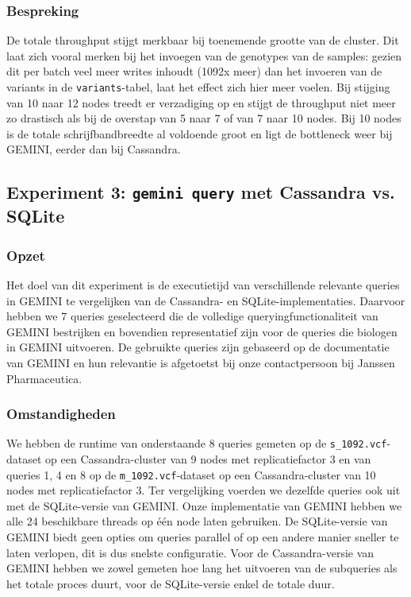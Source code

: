 \subsubsection{Bespreking}

De totale throughput stijgt merkbaar bij toenemende grootte van de cluster. Dit laat zich vooral merken bij het invoegen van de genotypes van de samples: gezien dit per batch veel meer writes inhoudt  (1092x meer) dan het invoeren van de variants in de  \texttt{variants}-tabel, laat het effect zich hier meer voelen. Bij stijging van 10 naar 12 nodes treedt er verzadiging op en stijgt de throughput niet meer zo drastisch als bij de overstap van 5 naar 7 of van 7 naar 10 nodes. Bij 10 nodes is de totale schrijfbandbreedte al voldoende groot en ligt de bottleneck weer bij GEMINI, eerder dan bij Cassandra.

\subsection{Experiment 3: \texttt{gemini query} met Cassandra vs. SQLite}
\label{exp3}

\subsubsection{Opzet}
Het doel van dit experiment is de executietijd van verschillende relevante queries in GEMINI te vergelijken van de Cassandra- en SQLite-implementaties. Daarvoor hebben we 7 queries geselecteerd die de volledige queryingfunctionaliteit van GEMINI bestrijken en bovendien representatief zijn voor de queries die biologen in GEMINI uitvoeren. De gebruikte queries zijn gebaseerd op de documentatie van GEMINI en hun relevantie is afgetoetst bij onze contactpersoon bij Janssen Pharmaceutica.

\subsubsection{Omstandigheden}

We hebben de runtime van onderstaande 8 queries gemeten op de \texttt{s\_1092.vcf}-dataset op een Cassandra-cluster van 9 nodes met replicatiefactor 3 en van queries 1, 4 en 8 op de \texttt{m\_1092.vcf}-dataset op een Cassandra-cluster van 10 nodes met replicatiefactor 3. Ter vergelijking voerden we dezelfde queries ook uit met de SQLite-versie van GEMINI. Onze implementatie van GEMINI hebben we alle 24 beschikbare threads op \'e\'en node laten gebruiken. De SQLite-versie van GEMINI biedt geen opties om queries parallel of op een andere manier sneller te laten verlopen, dit is dus snelste configuratie. Voor de Cassandra-versie van GEMINI hebben we zowel gemeten hoe lang het uitvoeren van de subqueries als het totale proces duurt, voor de SQLite-versie enkel de totale duur.


